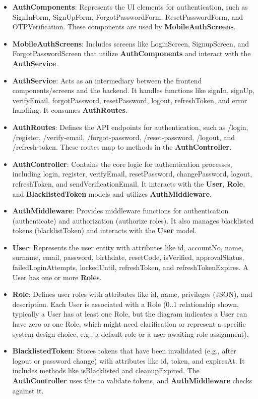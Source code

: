 \begin{itemize}
    \item \textbf{AuthComponents}: Represents the UI elements for authentication, such as SignInForm, SignUpForm, ForgotPasswordForm, ResetPasswordForm, and OTPVerification. These components are used by \textbf{MobileAuthScreens}.
    \item \textbf{MobileAuthScreens}: Includes screens like LoginScreen, SignupScreen, and ForgotPasswordScreen that utilize \textbf{AuthComponents} and interact with the \textbf{AuthService}.
    \item \textbf{AuthService}: Acts as an intermediary between the frontend components/screens and the backend. It handles functions like signIn, signUp, verifyEmail, forgotPassword, resetPassword, logout, refreshToken, and error handling. It consumes \textbf{AuthRoutes}.
    \item \textbf{AuthRoutes}: Defines the API endpoints for authentication, such as /login, /register, /verify-email, /forgot-password, /reset-password, /logout, and /refresh-token. These routes map to methods in the \textbf{AuthController}.
    \item \textbf{AuthController}: Contains the core logic for authentication processes, including login, register, verifyEmail, resetPassword, changePassword, logout, refreshToken, and sendVerificationEmail. It interacts with the \textbf{User}, \textbf{Role}, and \textbf{BlacklistedToken} models and utilizes \textbf{AuthMiddleware}.
    \item \textbf{AuthMiddleware}: Provides middleware functions for authentication (authenticate) and authorization (authorize roles). It also manages blacklisted tokens (blacklistToken) and interacts with the \textbf{User} model.
    \item \textbf{User}: Represents the user entity with attributes like id, accountNo, name, surname, email, password, birthdate, resetCode, isVerified, approvalStatus, failedLoginAttempts, lockedUntil, refreshToken, and refreshTokenExpires. A User has one or more \textbf{Role}s.
    \item \textbf{Role}: Defines user roles with attributes like id, name, privileges (JSON), and description. Each User is associated with a Role (0..1 relationship shown, typically a User has at least one Role, but the diagram indicates a User can have zero or one Role, which might need clarification or represent a specific system design choice, e.g., a default role or a user awaiting role assignment).
    \item \textbf{BlacklistedToken}: Stores tokens that have been invalidated (e.g., after logout or password change) with attributes like id, token, and expiresAt. It includes methods like isBlacklisted and cleanupExpired. The \textbf{AuthController} uses this to validate tokens, and \textbf{AuthMiddleware} checks against it.
\end{itemize}


